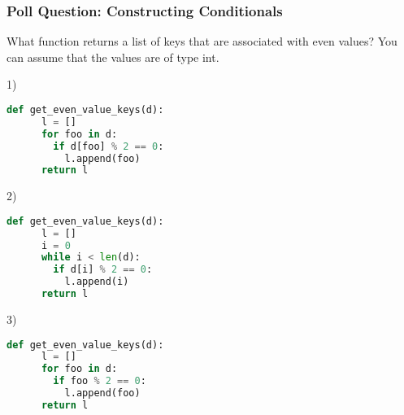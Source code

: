 \documentclass{beamer}
\begin{document}
%
%
\begin{frame}[fragile]
	\frametitle{Poll Question: Constructing Conditionals}
  What function returns a list of keys that are associated with even values? You can assume that the values are of type int.
	\vfill
	\begin{minipage}{0.32\textwidth}
    1)
		\begin{lstlisting}[language=Python, autogobble,basicstyle=\tiny,numbers=none]
    def get_even_value_keys(d):
      l = []
      for foo in d:
        if d[foo] % 2 == 0:
          l.append(foo)
      return l
		\end{lstlisting}
	\end{minipage}
	\begin{minipage}{0.32\textwidth}
    2)
		\begin{lstlisting}[language=Python, autogobble,basicstyle=\tiny,numbers=none]
    def get_even_value_keys(d):
      l = []
      i = 0
      while i < len(d):
        if d[i] % 2 == 0:
          l.append(i)
      return l
		\end{lstlisting}
	\end{minipage}
	\begin{minipage}{0.32\textwidth}
    3)
		\begin{lstlisting}[language=Python, autogobble,basicstyle=\tiny,numbers=none]
    def get_even_value_keys(d):
      l = []
      for foo in d:
        if foo % 2 == 0:
          l.append(foo)
      return l
		\end{lstlisting}
	\end{minipage}
\end{frame}
\end{document}

